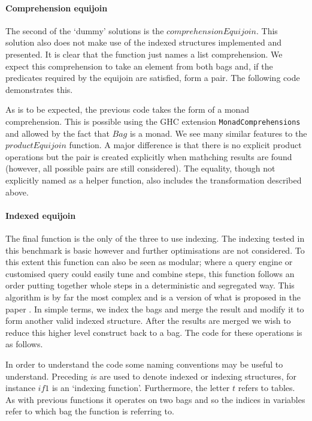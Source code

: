 \paragraph{Comprehension equijoin} The second of the `dummy' solutions is the
$comprehensionEquijoin$.
This solution also does not make use of the indexed structures implemented and
presented. It is
clear that the function just names a list comprehension. We expect this
comprehension to take an element from both bags and, if the predicates required
by the equijoin are satisfied, form a pair. The following code demonstrates
this.



\noindent
As is to be expected, the previous code takes the form of a monad comprehension.
This is possible using the GHC extension \verb|MonadComprehensions| and allowed by
the fact that $Bag$ is a monad. We see many similar
features to the $productEquijoin$ function. A major difference is that there is
no explicit product operations but the pair is created explicitly when mathching
results are found (however, all possible pairs are still considered). The equality, though
not explicitly named as a helper function, also includes the transformation described above.

\paragraph{Indexed equijoin} The final function is the only of the three to use
indexing. The indexing tested in this benchmark is basic however and further
optimisations are not considered. To this extent this function can also be seen as
modular; where a query engine or
customised query could easily tune and combine steps, this function follows an
order putting together whole steps in a deterministic and segregated way.
This algorithm is by far
the most complex and is a version of what is proposed in the paper \relalg{}. In
simple terms, we index the bags and merge the result and modify it to form
another valid indexed
structure. After the results are
merged we wish to reduce this higher level construct back to a bag. The code for
these operations is as follows.



\noindent
In order to understand the code some naming conventions may be useful to
understand. Preceding $i$s are used to denote indexed or indexing structures,
for instance $if1$ is an `indexing function'. Furthermore, the letter $t$
refers to tables. As with previous functions it operates on two bags and
so the indices in variables refer to which bag the function is referring to.

